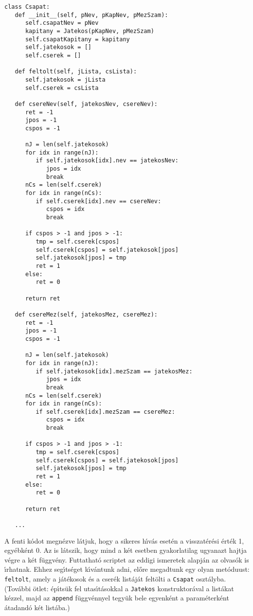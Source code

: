 
\begin{Verbatim}[fontsize=\small]
class Csapat:
   def __init__(self, pNev, pKapNev, pMezSzam):
      self.csapatNev = pNev
      kapitany = Jatekos(pKapNev, pMezSzam)
      self.csapatKapitany = kapitany
      self.jatekosok = []
      self.cserek = []

   def feltolt(self, jLista, csLista):
      self.jatekosok = jLista
      self.cserek = csLista

   def csereNev(self, jatekosNev, csereNev):
      ret = -1
      jpos = -1
      cspos = -1

      nJ = len(self.jatekosok)
      for idx in range(nJ):
         if self.jatekosok[idx].nev == jatekosNev:
            jpos = idx
            break
      nCs = len(self.cserek)
      for idx in range(nCs):
         if self.cserek[idx].nev == csereNev:
            cspos = idx
            break

      if cspos > -1 and jpos > -1:
         tmp = self.cserek[cspos]
         self.cserek[cspos] = self.jatekosok[jpos]
         self.jatekosok[jpos] = tmp
         ret = 1
      else:
         ret = 0

      return ret

   def csereMez(self, jatekosMez, csereMez):
      ret = -1
      jpos = -1
      cspos = -1

      nJ = len(self.jatekosok)
      for idx in range(nJ):
         if self.jatekosok[idx].mezSzam == jatekosMez:
            jpos = idx
            break
      nCs = len(self.cserek)
      for idx in range(nCs):
         if self.cserek[idx].mezSzam == csereMez:
            cspos = idx
            break

      if cspos > -1 and jpos > -1:
         tmp = self.cserek[cspos]
         self.cserek[cspos] = self.jatekosok[jpos]
         self.jatekosok[jpos] = tmp
         ret = 1
      else:
         ret = 0

      return ret

   ...
\end{Verbatim}

A fenti k\'odot megn\'ezve l\'atjuk, hogy a sikeres h\'{\i}v\'as eset\'en a visszat\'er\'esi \'ert\'ek 1, egy\'ebk\'ent 
0. Az is l\'atszik, hogy mind a k\'et esetben gyakorlatilag ugyanazt hajtja v\'egre a k\'et f\"uggv\'eny. Futtathat\'o 
scriptet az eddigi ismeretek alapj\'an az olvas\'ok is \'{\i}rhatnak. Ehhez seg\'{\i}ts\'eget k\'{\i}v\'antunk adni, 
el\H{o}re megadtunk egy olyan met\'oduust: {\tt feltolt}, amely a j\'at\'ekosok \'es a cser\'ek list\'aj\'at felt\"olti 
a {\tt Csapat} oszt\'alyba. (Tov\'abbi \"otlet: \'ep\'{\i}ts\"uk fel utas\'{\i}t\'asokkal a {\tt Jatekos} konstruktor\'aval 
a list\'akat k\'ezzel, majd az {\tt append} f\"uggv\'ennyel tegy\"uk bele egyenk\'ent a param\'eterk\'ent \'atadand\'o 
k\'et list\'aba.)

